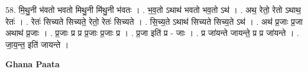 \documentclass[17pt]{extarticle}
\begin{document}
58. मि॒थु॒नी भ॑वतो भवतो मिथु॒नी मि॑थु॒नी भ॑वतः । . भ॒व॒तो ऽथाथ॑ भवतो भव॒तो ऽथ॑ । . अथ॒ रेतो॒ रेतो ऽथाथ॒ रेतः॑ । . रेतः॑ सिच्यते सिच्यते॒ रेतो॒ रेतः॑ सिच्यते । . सि॒च्य॒ते ऽथाथ॑ सिच्यते सिच्य॒ते ऽथ॑ । . अथ॑ प्र॒जाः प्र॒जा अथाथ॑ प्र॒जाः । . प्र॒जाः प्र प्र प्र॒जाः प्र॒जाः प्र । . प्र॒जा इति॑ प्र - जाः । . प्र जा॑यन्ते जायन्ते॒ प्र प्र जा॑यन्ते । . जा॒य॒न्त॒ इति॑ जायन्ते । \newline

\textbf{Ghana Paata } \newline
\end{document}

